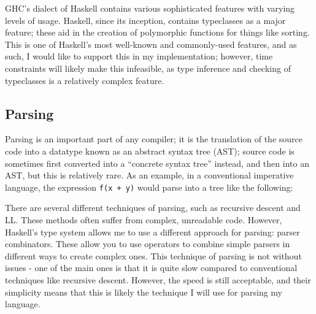 \documentclass[9pt]{extarticle}
\begin{document}
GHC's dialect of Haskell contains various sophisticated features with varying
levels of usage. Haskell, since its inception, contains typeclasses as a major
feature; these aid in the creation of polymorphic functions for things like
sorting. This is one of Haskell's most well-known and commonly-used features,
and as such, I would like to support this in my implementation; however, time
constraints will likely make this infeasible, as type inference and checking of
typeclasses is a relatively complex feature. 

\subsection{Parsing}

Parsing is an important part of any compiler; it is the translation of the
source code into a datatype known as an abstract syntax tree (AST); source code
is sometimes first converted into a ``concrete syntax tree'' instead, and then
into an AST, but this is relatively rare. As an example, in a conventional
imperative language, the expression \verb'f(x + y)' would parse into a tree like the
following:

\vspace{0.5cm}

\begin{center}
\end{center}

\vspace{0.5cm}

There are several different techniques of parsing, such as recursive descent and
LL. These methods often suffer from complex, unreadable code. However, Haskell's
type system allows me to use a different approach for parsing: parser
combinators. These allow you to use operators to combine simple parsers in
different ways to create complex ones. This technique of parsing is not without
issues - one of the main ones is that it is quite slow compared to conventional
techniques like recursive descent. However, the speed is still acceptable, and
their simplicity means that this is likely the technique I will use for parsing
my language.
\end{document}
